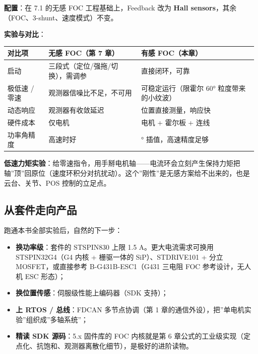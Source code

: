 \documentclass[
  UTF8,
  scheme=plain,
  fontsize=10pt,
  openany
]{ctexbook}
\begin{document}
\textbf{配置}：在 7.1 的无感 FOC 工程基础上，Feedback 改为 \textbf{Hall
sensors}，其余（FOC、3-shunt、速度模式）不变。

\textbf{实验与对比}：

{\def\LTcaptype{none} %
\begin{longtable}[]{@{}
  >{\raggedright\arraybackslash}p{}
  >{\raggedright\arraybackslash}p{}
  >{\raggedright\arraybackslash}p{}@{}}
\toprule\noalign{}
\begin{minipage}[b]{\linewidth}\raggedright
对比项
\end{minipage} & \begin{minipage}[b]{\linewidth}\raggedright
无感 FOC（第 7 章）
\end{minipage} & \begin{minipage}[b]{\linewidth}\raggedright
有感 FOC（本章）
\end{minipage} \\
\midrule\noalign{}
\endhead
\bottomrule\noalign{}
\endlastfoot
启动 & 三段式（定位/强拖/切换），需调参 & 直接闭环，可靠 \\
极低速 / 零速 & 观测器信噪比不足，不可用 & 可稳定运行（限霍尔 60°
粒度带来的小纹波） \\
动态响应 & 观测器有收敛延迟 & 位置直接测量，响应快 \\
硬件成本 & 仅电机 & 电机 + 霍尔板 + 连线 \\
功率角精度 & 高速时好 & 60° 插值，高速精度足够 \\
\end{longtable}
}

\textbf{低速力矩实验}：给零速指令，用手掰电机轴------电流环会立刻产生保持力矩把轴''顶''回原位（速度环积分对抗扰动）。这个''刚性''是无感方案给不出来的，也是云台、关节、POS
控制的立足点。

\subsection{从套件走向产品}\label{ux4eceux5957ux4ef6ux8d70ux5411ux4ea7ux54c1}

跑通本书全部实验后，自然的下一步：

\begin{itemize}
\tightlist
\item
  \textbf{换功率级}：套件的 STSPIN830 上限 1.5 A。更大电流需求可换用
  STSPIN32G4（G4 内核 + 栅驱一体的 SiP）、STDRIVE101 + 分立
  MOSFET，或直接参考 B-G431B-ESC1（G431 三电阻 FOC 参考设计，无人机 ESC
  形态）；
\item
  \textbf{换位置传感}：伺服级性能上编码器（SDK 支持）；
\item
  \textbf{上 RTOS / 总线}：FDCAN 多节点协调（第 1
  章的通信外设），把''单电机实验''组织成''多轴系统''；
\item
  \textbf{精读 SDK 源码}：5.x 固件库的 FOC 内核就是第 6
  章公式的工业级实现（定点化、抗饱和、观测器离散化细节），是极好的进阶读物。
\end{itemize}
\end{document}
